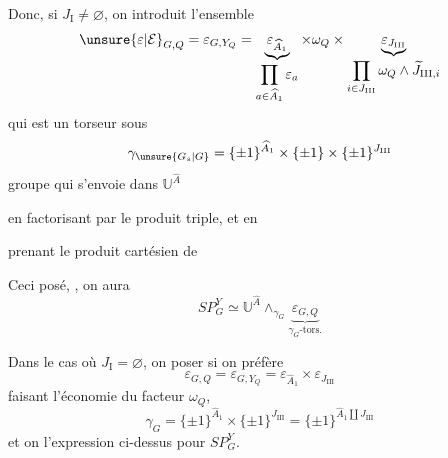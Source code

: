 Donc, si $J_{\mathrm I}\ne\varnothing$, on introduit l'ensemble
\[
\unsure{\varepsilon|\mathcal E}_{G,Q}=\varepsilon_{G,Y_Q}
=\underbrace{\varepsilon_{\widehat A_1}}_{\displaystyle\prod_{a\in\widehat A_1}\varepsilon_a}
\times\omega_Q\times
\underbrace{\varepsilon_{J_{\mathrm{III}}}}_{\displaystyle\prod_{i\in J_{\mathrm{III}}}\omega_Q\wedge\widetilde J_{\mathrm{III},i}}
\]
qui est un torseur sous
\[
\gamma_{\unsure{G_s|G}}=\{\pm1\}^{\widehat A_1}\times\{\pm1\}\times\{\pm1\}^{J_{\mathrm{III}}}
\]
groupe qui s'envoie dans $\mathbb U^{\widehat A}$

en factorisant par le produit triple, et en

prenant le produit cartésien de

Ceci posé, , on aura
\[
SP_G^Y\simeq\mathbb U^{\widehat A}\mathop{\wedge}_{\gamma_G}
\underbrace{\varepsilon_{G,Q}}_{\gamma_G\text{-tors.}}
\]

Dans le cas où $J_{\mathrm I}=\varnothing$, on  poser si on préfère
\[
\varepsilon_{G,Q}=\varepsilon_{G,Y_Q}=\varepsilon_{\widehat A_1}\times\varepsilon_{J_{\mathrm{III}}}
\]
faisant l'économie du facteur $\omega_Q$, 
\[
\gamma_G=\{\pm1\}^{\widehat A_1}\times\{\pm1\}^{J_{\mathrm{III}}}
=\{\pm1\}^{\widehat A_1\amalg J_{\mathrm{III}}}
\]
et on  l'expression ci-dessus pour $SP_G^Y$.

